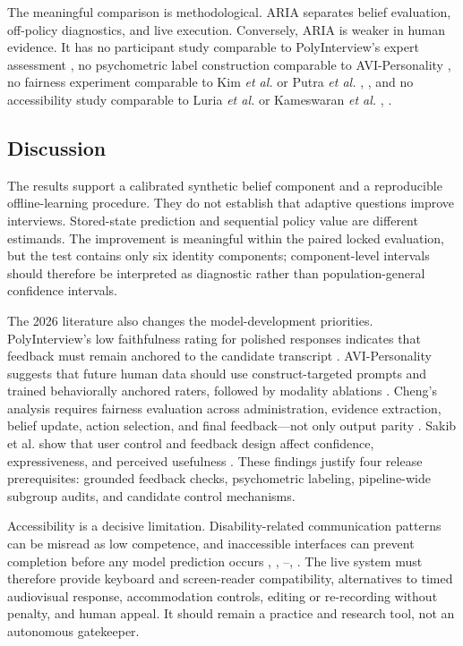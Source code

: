\documentclass[journal]{IEEEtran}
\begin{document}
The meaningful comparison is methodological. ARIA separates belief evaluation, off-policy diagnostics, and live execution. Conversely, ARIA is weaker in human evidence. It has no participant study comparable to PolyInterview's expert assessment \cite{wen2026polyinterview}, no psychometric label construction comparable to AVI-Personality \cite{zhang2026avipersonality}, no fairness experiment comparable to Kim \emph{et al.} or Putra \emph{et al.} \cite{kim2023fairness}, \cite{putra2024magbert}, and no accessibility study comparable to Luria \emph{et al.} or Kameswaran \emph{et al.} \cite{luria2026disability}, \cite{kameswaran2026surveilling}.


\subsection{Discussion}

The results support a calibrated synthetic belief component and a reproducible offline-learning procedure. They do not establish that adaptive questions improve interviews. Stored-state prediction and sequential policy value are different estimands. The improvement is meaningful within the paired locked evaluation, but the test contains only six identity components; component-level intervals should therefore be interpreted as diagnostic rather than population-general confidence intervals.


The 2026 literature also changes the model-development priorities. PolyInterview's low faithfulness rating for polished responses indicates that feedback must remain anchored to the candidate transcript \cite{wen2026polyinterview}. AVI-Personality suggests that future human data should use construct-targeted prompts and trained behaviorally anchored raters, followed by modality ablations \cite{zhang2026avipersonality}. Cheng's analysis requires fairness evaluation across administration, evidence extraction, belief update, action selection, and final feedback---not only output parity \cite{cheng2026fairness}. Sakib et al. show that user control and feedback design affect confidence, expressiveness, and perceived usefulness \cite{sakib2026expecting}. These findings justify four release prerequisites: grounded feedback checks, psychometric labeling, pipeline-wide subgroup audits, and candidate control mechanisms.


Accessibility is a decisive limitation. Disability-related communication patterns can be misread as low competence, and inaccessible interfaces can prevent completion before any model prediction occurs \cite{buyl2022disability}, \cite{benson2024autistic}, \cite{luria2026disability}--\cite{tilmes2022disability}, \cite{fisher2024disability}. The live system must therefore provide keyboard and screen-reader compatibility, alternatives to timed audiovisual response, accommodation controls, editing or re-recording without penalty, and human appeal. It should remain a practice and research tool, not an autonomous gatekeeper.
\end{document}
